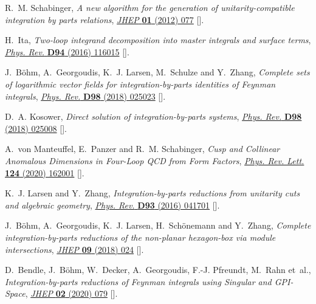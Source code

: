 \documentclass[11pt,a4paper,DIV=11,numbers=noenddot,parskip=half]{scrartcl}
\begin{document}
\begin{thebibliography}{10}
R.~M. Schabinger, \emph{{A new algorithm for the generation of
  unitarity-compatible integration by parts relations}},
  \href{https://doi.org/10.1007/JHEP01(2012)077}{\emph{JHEP} {\bfseries 01}
  (2012) 077} [\href{https://arxiv.org/abs/1111.4220}{{}}].

H.~Ita, \emph{{Two-loop integrand decomposition into master integrals and
  surface terms}},
  \href{https://doi.org/10.1103/PhysRevD.94.116015}{\emph{Phys. Rev.}
  {\bfseries D94} (2016) 116015}
  [\href{https://arxiv.org/abs/1510.05626}{{}}].

J.~Böhm, A.~Georgoudis, K.~J. Larsen, M.~Schulze and Y.~Zhang, \emph{{Complete
  sets of logarithmic vector fields for integration-by-parts identities of
  Feynman integrals}},
  \href{https://doi.org/10.1103/PhysRevD.98.025023}{\emph{Phys. Rev.}
  {\bfseries D98} (2018) 025023}
  [\href{https://arxiv.org/abs/1712.09737}{{}}].

D.~A. Kosower, \emph{{Direct solution of integration-by-parts systems}},
  \href{https://doi.org/10.1103/PhysRevD.98.025008}{\emph{Phys. Rev.}
  {\bfseries D98} (2018) 025008}
  [\href{https://arxiv.org/abs/1804.00131}{{}}].

A.~von Manteuffel, E.~Panzer and R.~M. Schabinger, \emph{{Cusp and Collinear
  Anomalous Dimensions in Four-Loop QCD from Form Factors}},
  \href{https://doi.org/10.1103/PhysRevLett.124.162001}{\emph{Phys. Rev. Lett.}
  {\bfseries 124} (2020) 162001}
  [\href{https://arxiv.org/abs/2002.04617}{{}}].

K.~J. Larsen and Y.~Zhang, \emph{{Integration-by-parts reductions from
  unitarity cuts and algebraic geometry}},
  \href{https://doi.org/10.1103/PhysRevD.93.041701}{\emph{Phys. Rev.}
  {\bfseries D93} (2016) 041701}
  [\href{https://arxiv.org/abs/1511.01071}{{}}].

J.~Böhm, A.~Georgoudis, K.~J. Larsen, H.~Schönemann and Y.~Zhang,
  \emph{{Complete integration-by-parts reductions of the non-planar hexagon-box
  via module intersections}},
  \href{https://doi.org/10.1007/JHEP09(2018)024}{\emph{JHEP} {\bfseries 09}
  (2018) 024} [\href{https://arxiv.org/abs/1805.01873}{{}}].

D.~Bendle, J.~Böhm, W.~Decker, A.~Georgoudis, F.-J. Pfreundt, M.~Rahn et~al.,
  \emph{{Integration-by-parts reductions of Feynman integrals using Singular
  and GPI-Space}}, \href{https://doi.org/10.1007/JHEP02(2020)079}{\emph{JHEP}
  {\bfseries 02} (2020) 079}
  [\href{https://arxiv.org/abs/1908.04301}{{}}].


\end{thebibliography}
\end{document}
